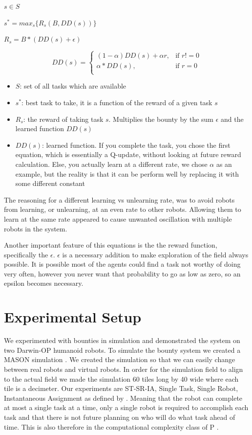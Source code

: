 \documentclass[twocolumn]{article}
\begin{document}
$s \in S$


$s^* = max_s\{R_s(B,DD(s))\}$


$R_s=B*(DD(s)+\epsilon)$

\[ DD(s) = 
\begin{cases}
     (1-\alpha)DD(s)+ \alpha r,& \text{if } r!=0\\
     \alpha*DD(s),& \text{if } r=0\\

\end{cases}
\]

\begin{itemize}
\item $S$: set of all tasks which are available
\item $s^*$:  best task to take, it is a function of the reward of a given task $s$
\item $R_s$: the reward of taking task $s$. Multiplies the bounty by the sum $\epsilon$ and the learned function $DD(s)$
\item $DD(s)$:  learned function. If you complete the task, you chose the first equation, which is essentially a Q-update, without looking at future reward calculation. Else, you actually learn at a different rate, we chose $\alpha$ as an example, but the reality is that it can be perform well by replacing it with some different constant


\end{itemize}
The reasoning for a different learning vs unlearning rate, was to avoid robots from learning, or unlearning, at an even rate to other robots. Allowing them to learn at the same rate appeared to cause unwanted oscillation with multiple robots in the system. 

Another important feature of this equations is the the reward function, specifically the $\epsilon$. $\epsilon$ is a necessary addition to make exploration of the field always possible. It is possible most of the agents could find a task not worthy of doing very often, however you never want that probability to go as low as zero, so an epsilon becomes necessary.
\section{Experimental Setup}

We experimented with bounties in simulation and demonstrated the system on two Darwin-OP humanoid robots.  To simulate the bounty system we created a MASON simulation \cite{Luke2003}.  We created the simulation so that we can easily change between real robots and virtual robots.  In order for the simulation field to align to the actual field we made the simulation 60 tiles long by 40 wide where each tile is a decimeter.  Our experiments are ST-SR-IA, Single Task, Single Robot, Instantaneous Assignment as defined by \cite{Gerkey2004}.  Meaning that the robot can complete at most a single task at a time, only a single robot is required to accomplish each task and that there is not future planning on who will do what task ahead of time.  This is also therefore in the computational complexity class of P \cite{Campbell2010, Gerkey2003}.
\end{document}
